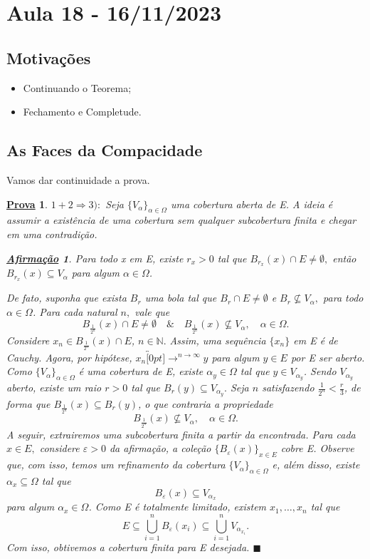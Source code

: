 \documentclass{article}
\newtheorem*{proof*}{\underline{Prova}}
\newtheorem*{claim*}{\underline{Afirmação}}
\renewcommand\qedsymbol{$\blacksquare$}
\begin{document}
\newpage

\section{Aula 18 - 16/11/2023}
\subsection{Motivações}
\begin{itemize}
  \item Continuando o Teorema;
  \item Fechamento e Completude.
\end{itemize}
\subsection{As Faces da Compacidade}
  Vamos dar continuidade a prova. 
 \begin{proof*}
  \(1 + 2 \Rightarrow 3):\) Seja \(\{V_{\alpha }\}_{\alpha \in \Omega }\) uma cobertura aberta de E. A ideia
é assumir a existência de uma cobertura sem qualquer subcobertura finita e chegar em uma contradição.

\begin{claim*}Para todo x em E, existe \(r_{x}> 0\) tal que \(B_{r_{x}}(x)\cap E \neq\emptyset, \) então 
 \(B_{r_{x}}(x)\subseteq V_{\alpha }\) para algum \(\alpha \in \Omega \).
\end{claim*}

  De fato, suponha que exista \(B_{r}\) uma bola tal que \(B_{r}\cap E \neq\emptyset\) e \(B_{r}\not\subseteq V_{\alpha },\) para todo
 \(\alpha \in \Omega \). Para cada natural \(n,\) vale que 
  \[
    B_{\frac{1}{2^{n}}}(x)\cap E \neq\emptyset\quad\&\quad B_{\frac{1}{2^{n}}}(x)\not\subseteq V_{\alpha }, \quad\alpha \in \Omega .
  \] 
  Considere \(x_{n}\in B_{\frac{1}{2^{n}}}(x)\cap E\), \(n\in \mathbb{N}.\) Assim, uma sequência \(\{x_{n}\}\) em E é
de Cauchy. Agora, por hipótese, \(x_{n}\overbracket[0pt]{\longrightarrow}^{n\to \infty}y\) para algum \(y\in E\) por
E ser aberto. Como \(\{V_{\alpha }\}_{\alpha \in \Omega }\) é uma cobertura de E, existe \(\alpha_{y} \in \Omega \) tal que
\(y\in V_{\alpha_{y}}\). Sendo \(V_{\alpha_{y}}\) aberto, existe um raio \(r > 0\) tal que \(B_{r}(y)\subseteq V_{\alpha _{y}}.\)
Seja \(n\) satisfazendo \(\frac{1}{2^{n}} < \frac{r}{3}\), de forma que \(B_{\frac{1}{2^{n}}}(x)\subseteq B_{r}(y)\), o que
contraria a propriedade 
  \[
    B_{\frac{1}{2^{n}}}(x)\not\subseteq V_{\alpha }, \quad\alpha \in \Omega .
  \]
  A seguir, extrairemos uma subcobertura finita a partir da encontrada. Para cada \(x\in E, \) considere
 \(\varepsilon > 0\) da afirmação, a coleção \(\{B_{\varepsilon }(x)\}_{x\in E}\) cobre E. Observe que, com isso,
 temos um refinamento da cobertura \(\{V_{\alpha }\}_{\alpha \in \Omega }\) e, além disso, existe \(\alpha_{x}\subseteq \Omega \)
 tal que 
  \[
    B_{\varepsilon }(x)\subseteq V_{\alpha_{x}}
  \]
  para algum \(\alpha_{x}\in \Omega \). Como E é totalmente limitado, existem \(x_{1}, \dotsc, x_{n}\) tal que 
  \[
    E\subseteq \bigcup_{i=1}^{n}B_{\varepsilon }(x_{i})\subseteq \bigcup_{i=1}^{n}V_{\alpha_{x_{i}}}.
  \]
  Com isso, obtivemos a cobertura finita para E desejada. \qedsymbol
 \end{proof*}
\end{document}
